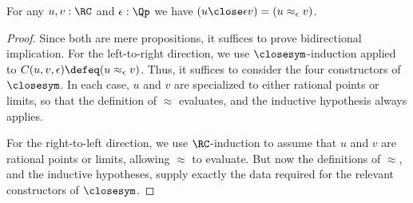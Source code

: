 %
\begin{thm}\label{thm:RC-sim-characterization}
  For any $u,v:\RC$ and $\epsilon:\Qp$ we have $(u\close\epsilon v) = (u\approx_\epsilon v)$.
\end{thm}

\begin{proof}
  Since both are mere propositions, it suffices to prove bidirectional implication.
  For the left-to-right direction, we use $\closesym$-induction applied to $C(u,v,\epsilon)\defeq (u\approx_\epsilon v)$.
  Thus, it suffices to consider the four constructors of $\closesym$.
  In each case, $u$ and $v$ are specialized to either rational points or limits, so that the definition of $\approx$ evaluates, and the inductive hypothesis always applies.

  For the right-to-left direction, we use $\RC$-induction to assume that $u$ and $v$ are rational points or limits, allowing $\approx$ to evaluate.
  But now the definitions of $\approx$, and the inductive hypotheses, supply exactly the data required for the relevant constructors of $\closesym$.
\end{proof}
